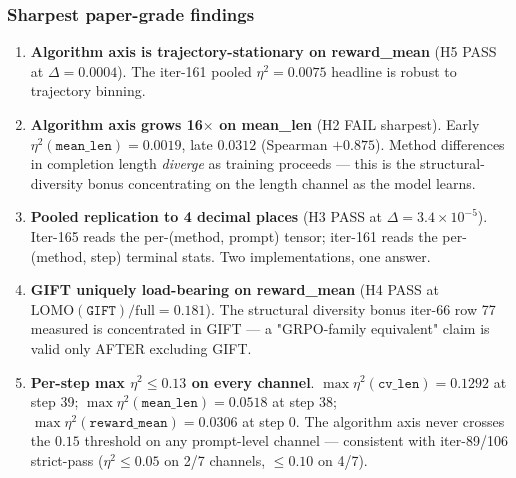\subsubsection{Sharpest paper-grade findings}
\begin{enumerate}
\item \textbf{Algorithm axis is trajectory-stationary on reward\_mean} (H5 PASS at $\Delta{=}0.0004$). The iter-161 pooled $\eta^2{=}0.0075$ headline is robust to trajectory binning.
\item \textbf{Algorithm axis grows 16$\times$ on mean\_len} (H2 FAIL sharpest). Early $\eta^2(\texttt{mean\_len}){=}0.0019$, late $0.0312$ (Spearman $+0.875$). Method differences in completion length \emph{diverge} as training proceeds --- this is the structural-diversity bonus concentrating on the length channel as the model learns.
\item \textbf{Pooled replication to 4 decimal places} (H3 PASS at $\Delta{=}3.4 \times 10^{-5}$). Iter-165 reads the per-(method, prompt) tensor; iter-161 reads the per-(method, step) terminal stats. Two implementations, one answer.
\item \textbf{GIFT uniquely load-bearing on reward\_mean} (H4 PASS at $\mathrm{LOMO}(\texttt{GIFT})/\mathrm{full} = 0.181$). The structural diversity bonus iter-66 row 77 measured is concentrated in GIFT --- a "GRPO-family equivalent" claim is valid only AFTER excluding GIFT.
\item \textbf{Per-step max $\eta^2 \le 0.13$ on every channel}. $\max \eta^2(\texttt{cv\_len}){=}0.1292$ at step 39; $\max \eta^2(\texttt{mean\_len}){=}0.0518$ at step 38; $\max \eta^2(\texttt{reward\_mean}){=}0.0306$ at step 0. The algorithm axis never crosses the $0.15$ threshold on any prompt-level channel --- consistent with iter-89/106 strict-pass ($\eta^2 \le 0.05$ on 2/7 channels, $\le 0.10$ on 4/7).
\end{enumerate}

